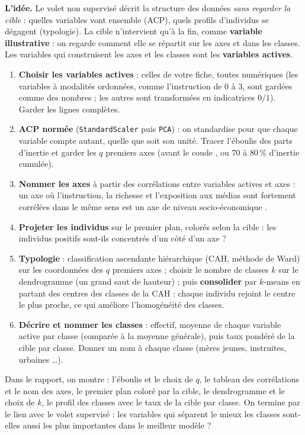 \documentclass[11pt]{article}
\begin{document}
\begin{aretenir}
\textbf{L'idée.} Le volet non supervisé décrit la structure des données \emph{sans regarder la cible} : quelles variables vont ensemble (ACP), quels profils d'individus se dégagent (typologie). La cible n'intervient qu'à la fin, comme \textbf{variable illustrative} : on regarde comment elle se répartit sur les axes et dans les classes. Les variables qui construisent les axes et les classes sont les \textbf{variables actives}.
\end{aretenir}

\begin{enumerate}
  \item \textbf{Choisir les variables actives} : celles de votre fiche, toutes numériques (les variables à modalités ordonnées, comme l'instruction de $0$ à $3$, sont gardées comme des nombres ; les autres sont transformées en indicatrices $0/1$). Garder les lignes complètes.
  \item \textbf{ACP normée} (\texttt{StandardScaler} puis \texttt{PCA}) : on standardise pour que chaque variable compte autant, quelle que soit son unité. Tracer l'éboulis des parts d'inertie et garder les $q$ premiers axes (avant le \og coude \fg{}, ou $70$ à $80\,\%$ d'inertie cumulée).
  \item \textbf{Nommer les axes} à partir des corrélations entre variables actives et axes : un axe où l'instruction, la richesse et l'exposition aux médias sont fortement corrélées dans le même sens est un axe de \og niveau socio-économique \fg{}.
  \item \textbf{Projeter les individus} sur le premier plan, colorés selon la cible : les individus positifs sont-ils concentrés d'un côté d'un axe ?
  \item \textbf{Typologie} : classification ascendante hiérarchique (CAH, méthode de Ward) sur les coordonnées des $q$ premiers axes ; choisir le nombre de classes $k$ sur le dendrogramme (un grand saut de hauteur) ; puis \textbf{consolider} par $k$-means en partant des centres des classes de la CAH : chaque individu rejoint le centre le plus proche, ce qui améliore l'homogénéité des classes.
  \item \textbf{Décrire et nommer les classes} : effectif, moyenne de chaque variable active par classe (comparée à la moyenne générale), puis taux pondéré de la cible par classe. Donner un nom à chaque classe (\og mères jeunes, instruites, urbaines \fg{}\dots).
\end{enumerate}
Dans le rapport, on montre : l'éboulis et le choix de $q$, le tableau des corrélations et le nom des axes, le premier plan coloré par la cible, le dendrogramme et le choix de $k$, le profil des classes avec le taux de la cible par classe. On termine par le lien avec le volet supervisé : les variables qui séparent le mieux les classes sont-elles aussi les plus importantes dans le meilleur modèle ?
\end{document}

